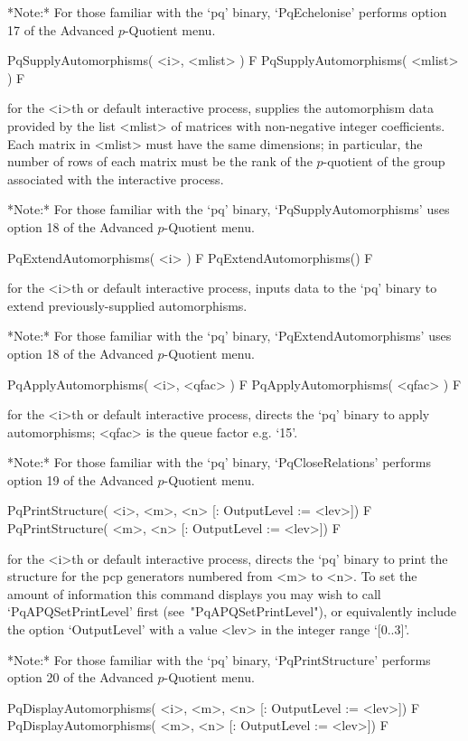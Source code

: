 *Note:*
For those familiar with the `pq' binary, `PqEchelonise'  performs  option
17 of the Advanced $p$-Quotient menu.

\>PqSupplyAutomorphisms( <i>, <mlist> ) F
\>PqSupplyAutomorphisms( <mlist> ) F

for the <i>th or  default  interactive  {\ANUPQ}  process,  supplies  the
automorphism  data  provided  by  the  list  <mlist>  of  matrices   with
non-negative integer coefficients. Each matrix in <mlist> must  have  the
same dimensions; in particular, the number of rows of each matrix must be
the rank of the $p$-quotient of the group associated with the interactive
{\ANUPQ} process.

*Note:* 
For those familiar with the  `pq'  binary,  `PqSupplyAutomorphisms'  uses
option 18 of the Advanced $p$-Quotient menu.

\>PqExtendAutomorphisms( <i> ) F
\>PqExtendAutomorphisms() F

for the <i>th or default interactive {\ANUPQ} process, inputs data to the
`pq' binary to extend previously-supplied automorphisms.

*Note:*
For those familiar with the  `pq'  binary,  `PqExtendAutomorphisms'  uses
option 18 of the Advanced $p$-Quotient menu.

\>PqApplyAutomorphisms( <i>, <qfac> ) F
\>PqApplyAutomorphisms( <qfac> ) F

for the <i>th or default interactive {\ANUPQ} process, directs  the  `pq'
binary to apply automorphisms; <qfac> is the queue factor e.g. `15'.

*Note:* 
For those familiar with  the  `pq'  binary,  `PqCloseRelations'  performs
option 19 of the Advanced $p$-Quotient menu.

\>PqPrintStructure( <i>, <m>, <n> [: OutputLevel := <lev>]) F
\>PqPrintStructure( <m>, <n> [: OutputLevel := <lev>]) F

for the <i>th or default interactive {\ANUPQ} process, directs  the  `pq'
binary to print the structure for the pcp generators numbered from <m> to
<n>. To set the amount of information this command displays you may  wish
to  call  `PqAPQSetPrintLevel'   first   (see~"PqAPQSetPrintLevel"),   or
equivalently include the option `OutputLevel' with a value <lev>  in  the
integer range `[0..3]'.


*Note:* 
For those familiar with  the  `pq'  binary,  `PqPrintStructure'  performs
option 20 of the Advanced $p$-Quotient menu.

\>PqDisplayAutomorphisms( <i>, <m>, <n> [: OutputLevel := <lev>]) F
\>PqDisplayAutomorphisms( <m>, <n> [: OutputLevel := <lev>]) F

